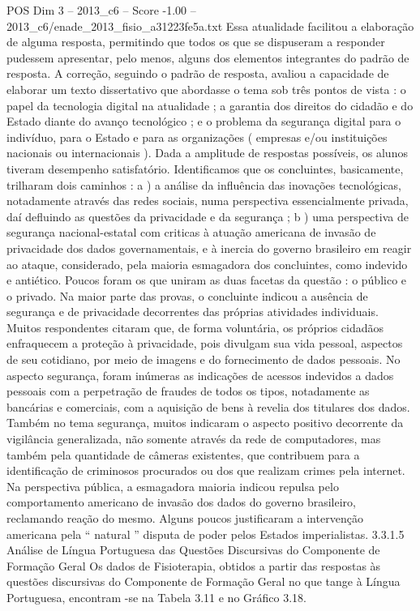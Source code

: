 \begin{textsample}{POS Dim 3 – 2013\_c6 – Score -1.00 – 2013\_c6/enade\_2013\_fisio\_a31223fe5a.txt}
Essa atualidade facilitou a elaboração de alguma resposta, permitindo que todos os que se dispuseram a responder pudessem apresentar, pelo menos, alguns dos elementos integrantes do padrão de resposta.
A correção, seguindo o padrão de resposta, avaliou a capacidade de elaborar um texto dissertativo que abordasse o tema sob três pontos de vista : o papel da tecnologia digital na atualidade ; a garantia dos direitos do cidadão e do Estado diante do avanço tecnológico ; e o problema da segurança digital para o indivíduo, para o Estado e para as organizações ( empresas e/ou instituições nacionais ou internacionais ).
Dada a amplitude de respostas possíveis, os alunos tiveram desempenho satisfatório.
Identificamos que os concluintes, basicamente, trilharam dois caminhos : a ) a análise da influência das inovações tecnológicas, notadamente através das redes sociais, numa perspectiva essencialmente privada, daí defluindo as questões da privacidade e da segurança ; b ) uma perspectiva de segurança nacional-estatal com criticas à atuação americana de invasão de privacidade dos dados governamentais, e à inercia do governo brasileiro em reagir ao ataque, considerado, pela maioria esmagadora dos concluintes, como indevido e antiético.
Poucos foram os que uniram as duas facetas da questão : o público e o privado.
Na maior parte das provas, o concluinte indicou a ausência de segurança e de privacidade decorrentes das próprias atividades individuais.
Muitos respondentes citaram que, de forma voluntária, os próprios cidadãos enfraquecem a proteção à privacidade, pois divulgam sua vida pessoal, aspectos de seu cotidiano, por meio de imagens e do fornecimento de dados pessoais.
No aspecto segurança, foram inúmeras as indicações de acessos indevidos a dados pessoais com a perpetração de fraudes de todos os tipos, notadamente as bancárias e comerciais, com a aquisição de bens à revelia dos titulares dos dados.
Também no tema segurança, muitos indicaram o aspecto positivo decorrente da vigilância generalizada, não somente através da rede de computadores, mas também pela quantidade de câmeras existentes, que contribuem para a identificação de criminosos procurados ou dos que realizam crimes pela internet.
Na perspectiva pública, a esmagadora maioria indicou repulsa pelo comportamento americano de invasão dos dados do governo brasileiro, reclamando reação do mesmo.
Alguns poucos justificaram a intervenção americana pela “ natural ” disputa de poder pelos Estados imperialistas. 3.3.1.5 Análise de Língua Portuguesa das Questões Discursivas do Componente de Formação Geral Os dados de Fisioterapia, obtidos a partir das respostas às questões discursivas do Componente de Formação Geral no que tange à Língua Portuguesa, encontram -se na Tabela 3.11 e no Gráfico 3.18.

\end{textsample}
